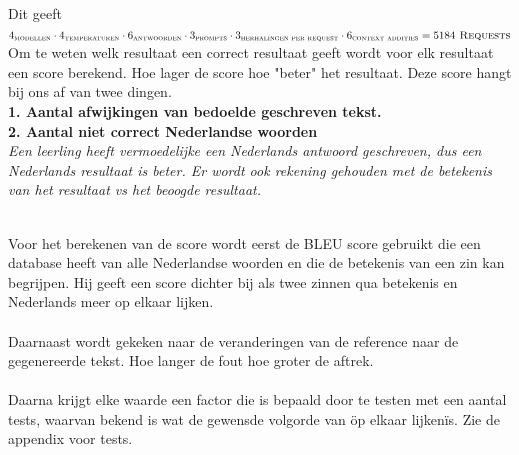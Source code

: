 \documentclass[12pt]{article}
\begin{document}
\vspace{3em}
Dit geeft \large$4_{\textsc{modellen}} \cdot 4_{\textsc{temperaturen}}  \cdot 6_{\textsc{antwoorden}} \cdot 3_{\textsc{prompts}}  \cdot 3_{\textsc{herhalingen per request}}  \cdot 6_{\textsc{context addities}}= 5184 \textsc{ Requests}$ \normalsize
\vspace{l}
Om te weten welk resultaat een correct resultaat geeft wordt voor elk resultaat een score berekend. Hoe lager de score hoe "beter" het resultaat. Deze score hangt bij ons af van twee dingen. \\
\textbf{1. Aantal afwijkingen van bedoelde geschreven tekst.}\\
\textbf{2. Aantal niet correct Nederlandse woorden}\\
\hspace{3em}\textit{Een leerling heeft vermoedelijke een Nederlands antwoord geschreven, dus een Nederlands resultaat is beter. Er wordt ook rekening gehouden met de betekenis van het resultaat vs het beoogde resultaat.}\\
\\
\begin{minipage}{0.5\linewidth}
Voor het berekenen van de score wordt eerst de BLEU score gebruikt die een database heeft van alle Nederlandse woorden en die de betekenis van een zin kan begrijpen. Hij geeft een score dichter bij als twee zinnen qua betekenis en Nederlands meer op elkaar lijken. \\
\\
Daarnaast wordt gekeken naar de veranderingen van de reference naar de gegenereerde tekst. Hoe langer de fout hoe groter de aftrek. \\
\\
Daarna krijgt elke waarde een factor die is bepaald door te testen met een aantal tests, waarvan bekend is wat de gewensde volgorde van \"op elkaar lijken\" is. 
Zie de appendix voor tests.
\end{minipage}%
\end{document}
